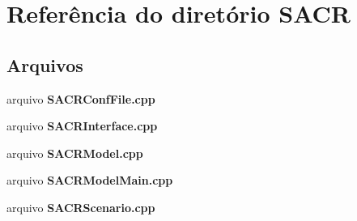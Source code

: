\section{Referência do diretório S\+A\+CR}
\label{dir_1357a52aeb479730cbfbac41d312d8cc}
\subsection*{Arquivos}
\begin{DoxyCompactItemize}
\item 
arquivo {\bf S\+A\+C\+R\+Conf\+File.\+cpp}
\item 
arquivo {\bf S\+A\+C\+R\+Interface.\+cpp}
\item 
arquivo {\bf S\+A\+C\+R\+Model.\+cpp}
\item 
arquivo {\bf S\+A\+C\+R\+Model\+Main.\+cpp}
\item 
arquivo {\bf S\+A\+C\+R\+Scenario.\+cpp}
\end{DoxyCompactItemize}
